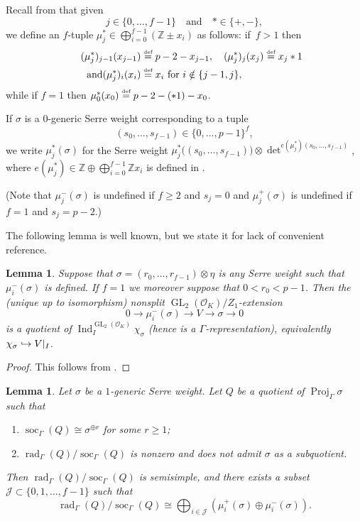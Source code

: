\documentclass[JEP,XML,SOM,Unicode,NoFloatCountersInSection, NoEqCountersInSection,published]{cedram}
\newcommand\hto{\mathrel{\lhook\joinrel\to}}
\newcommand{\quand}{\quad\text{and}\quad}
\newcommand{\defeq}{\stackrel{\textrm{\tiny{\upshape{def}}}}{=}}
\newcommand{\Z}{{\mathbb Z}}
\newcommand{\cJ}{{\mathcal{J}}}
\newcommand{\cO}{\mathcal{O}}
\DeclareMathOperator{\GL}{GL}
\DeclareMathOperator{\Ind}{Ind}
\DeclareMathOperator{\Proj}{Proj}
\DeclareMathOperator{\rad}{rad}
\DeclareMathOperator{\soc}{soc}
\theoremstyle{plain}
\newtheorem{lem}[prop]{Lemma}
\theoremstyle{definition}
\begin{document}
Recall from \cite[Def.\,2.9]{HuWang2} that given
\[
j\in\{0,\dots,f-1\}\quand *\in \{+,-\},
\]
we define an $f$-tuple $\mu_j^*\in \bigoplus_{i=0}^{f-1}(\Z\pm x_i)$ as follows: if~$f>1$ then
\begin{align*}
(\mu_j^*)_{j-1}(x_{j-1})&\defeq p-2-x_{j-1},\quad (\mu_j^*)_{j}(x_{j})\defeq x_{j}\ast1\\
\tag*{and}(\mu_j^*)_{i}(x_i)&\defeq x_i \text{ for }i\notin\{j-1,j\},
\end{align*}
while if $f = 1$ then $\mu_0^*(x_{0})\defeq p-2-(\ast 1)-x_0$.

If $\sigma$ is a $0$-generic Serre weight corresponding to a tuple
\[
(s_0,\dots,s_{f-1})\in\{0,\dots,p-1\}^f,
\]
we write $\mu^*_j(\sigma)$ for the Serre weight $\mu_j^*\bigl((s_0,\dots,s_{f-1})\bigr)\otimes\det^{e(\mu_j^*)(s_0,\dots,s_{f-1})}$, where $e(\mu_j^*)\in \Z\oplus \bigoplus_{i=0}^{f-1}\Z x_i$ is defined in \cite[\S 3]{BP}.

(Note that $\mu_j^-(\sigma)$ is undefined if $f \ge 2$ and $s_j = 0$ and $\mu_j^+(\sigma)$ is undefined if $f = 1$ and $s_j = p-2$.)

The following lemma is well known, but we state it for lack of convenient reference.

\begin{lem}\label{lem:mu-i+}
Suppose that $\sigma = (r_0,\dots,r_{f-1}) \otimes \eta$ is any Serre weight such that $\mu_i^-(\sigma)$ is defined.
If $f = 1$ we moreover suppose that $0 < r_0 < p-1$.
Then the (unique up to isomorphism) nonsplit $\GL_2(\cO_K)/Z_1$-extension\enlargethispage{-\baselineskip}
\[
0 \to \mu_i^-(\sigma) \to V \to \sigma \to 0
\]
is a quotient of $\Ind_I^{\GL_2(\cO_K)} \chi_{\sigma}$ {(hence is a $\Gamma$-representation)}, equivalently $\chi_{\sigma} \hto V|_I$.
\end{lem}

\begin{proof}
This follows from \cite[Th.\,2.4(iii) and Cor.\ 5.6(ii)]{BP}.
\end{proof}

\begin{lem}\label{lem:soc-cosoc-sigma}
Let $\sigma$ be a ${1}$-generic Serre weight.
Let $Q$ be a quotient of $\Proj_\Gamma \sigma$ such that
\begin{enumerate}
\item\label{lem:soc-cosoc-sigmai} $\soc_\Gamma(Q) \cong \sigma^{\oplus r}$ for some $r \ge 1$;
\item\label{lem:soc-cosoc-sigmaii} $\rad_\Gamma(Q)/\soc_\Gamma(Q)$ is nonzero and does not admit $\sigma$ as a subquotient.
\end{enumerate}
Then $\rad_\Gamma(Q)/\soc_\Gamma(Q)$ is semisimple, and there exists a subset $\cJ \subset \{0,1,\dots,f-1\}$ such that
\begin{equation*}
\rad_\Gamma(Q)/\soc_\Gamma(Q) \cong \bigoplus_{i \in \cJ} (\mu_i^+(\sigma) \oplus \mu_i^-(\sigma)).
\end{equation*}
\end{lem}
\end{document}
